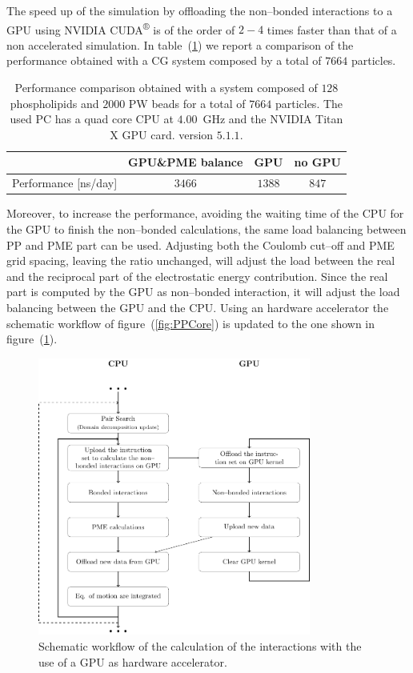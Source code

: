 The speed up of the simulation by offloading the non--bonded interactions to a GPU using NVIDIA 
CUDA\textsuperscript{®} is of the order of $2-4$ times faster than that of a non accelerated simulation. In 
table~(\ref{tab:performance}) we report a comparison of the performance obtained with a \ac{CG} system composed by 
a total of $7664$ particles.
\begin{table}[ht]
	\centering
	\begin{tabular}{lccc}
		\toprule
		\, 					& GPU\&\acs{PME} balance 	& GPU		& no GPU	\\ \midrule
		Performance [ns/day]& $3466$					& $1388$	& $847$		\\ \bottomrule
	\end{tabular}
	\caption{Performance comparison obtained with a system composed of $128$ phospholipids and $2000$ \ac{PW} beads for a total of $7664$ particles. The used PC has a quad core CPU at $4.00$~GHz and the NVIDIA Titan X GPU card. \gromacs version $5.1.1$.}%
	\label{tab:performance}
\end{table}
Moreover, to increase the performance, avoiding the waiting time of the CPU for the GPU to finish the non--bonded 
calculations, the same load balancing between \ac{PP} and \ac{PME} part can be used. Adjusting both the Coulomb 
cut--off and \ac{PME} grid spacing, leaving the ratio unchanged, will adjust the load between the real and the 
reciprocal part of the electrostatic energy contribution. Since the real part is computed by the GPU as 
non--bonded interaction, it will adjust the load balancing between the GPU and the CPU. Using an hardware 
accelerator the schematic workflow of figure~(\ref{fig:PPCore}) is updated to the one shown in 
figure~(\ref{fig:GPU}).
\begin{figure}[h!t]
	\centering
	\includegraphics[width=0.8\textwidth]{./img/Schemi/GPU}
	\caption{Schematic workflow of the calculation of the interactions with the use of a GPU as hardware accelerator.}%
	\label{fig:GPU}
\end{figure}

